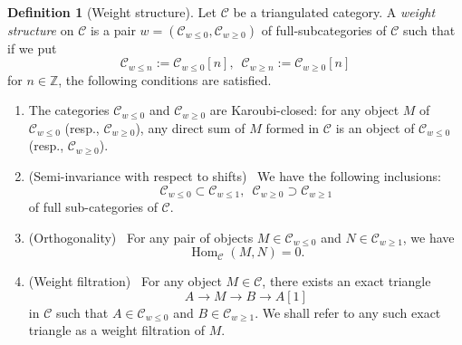 \documentclass[11pt, a4paper]{amsart}
\theoremstyle{plain}
\theoremstyle{definition}
\newtheorem{definition}[theorem]{Definition}
\numberwithin{equation}{section}
\def\ZZ{\mathbb{Z}}
\DeclareMathOperator{\Hom}{Hom}
\begin{document}
\begin{definition}[Weight structure]
\label{def: weight structure}
    Let $\mathcal{C}$ be a triangulated category. A \textit{weight structure} on $\mathcal{C}$ is a pair $w = (\mathcal{C}_{w \le 0}, \mathcal{C}_{w \ge 0})$ of full-subcategories of $\mathcal{C}$ such that if we put 
    \begin{equation*}
        \mathcal{C}_{w \le n} := \mathcal{C}_{w \le 0}[n], \, \, \, \mathcal{C}_{w \ge n}:= \mathcal{C}_{w \ge 0}[n]
    \end{equation*}
    for $n \in \ZZ$, the following conditions are satisfied. 
    \begin{enumerate}
        \item The categories $\mathcal{C}_{w \le 0}$ and $\mathcal{C}_{w \ge 0}$ are Karoubi-closed: for any object $M$ of $\mathcal{C}_{w \le 0}$ (resp., $\mathcal{C}_{w \ge 0}$), any direct sum of $M$ formed in $\mathcal{C}$ is an object of $\mathcal{C}_{w \le 0}$ (resp., $\mathcal{C}_{w \ge 0}$). 
        \item (Semi-invariance with respect to shifts) \  We have the following inclusions: 
        \begin{equation*}
            \mathcal{C}_{w \le 0} \subset \mathcal{C}_{w \le 1},  \, \, \, \mathcal{C}_{w \ge 0} \supset \mathcal{C}_{w \ge 1}
        \end{equation*}
        of full sub-categories of $\mathcal{C}$. 
        \item (Orthogonality) \ For any pair of objects $M \in \mathcal{C}_{w \le 0}$ and $N \in \mathcal{C}_{w \ge 1}$, we have 
        \begin{equation*}
            \Hom_{\mathcal{C}}(M, N) = 0. 
        \end{equation*}
        \item (Weight filtration) \ For any object $M \in \mathcal{C}$, there exists an exact triangle 
        \begin{equation*}
            A \rightarrow M \rightarrow B \rightarrow A[1]
        \end{equation*}
        in $\mathcal{C}$ such that $A \in \mathcal{C}_{w \le 0}$ and $B \in \mathcal{C}_{w \ge 1}$. We shall refer to any such exact triangle as a weight filtration of $M$. 
    \end{enumerate}
\end{definition}
\end{document}
